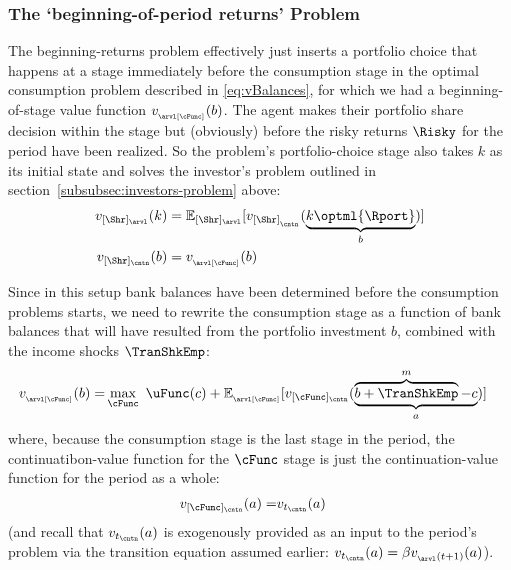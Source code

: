 \documentclass[titlepage, headings=optiontotocandhead]{Resources/texmf-local/tex/latex/econtex}
\begin{document}
\hypertarget{beginning-returns}{}
\subsubsection{The `beginning-of-period returns' Problem}\label{subsubsec:beginning-returns}
The beginning-returns problem effectively just inserts a portfolio choice that happens at a {stage} immediately before the consumption {stage} in the optimal consumption problem described in \eqref{eq:vBalances}, for which we had a beginning-of-{stage} value function $v_{_\arvl[\cFunc]}(b)$.  The agent makes their portfolio share decision within the {stage} but (obviously) before the risky returns $\Risky$ for the {period} have been realized.  So the problem's portfolio-choice {stage} also takes $k$ as its initial state and solves the investor's problem outlined in section~\ref{subsubsec:investors-problem} above:
\begin{equation}\begin{gathered}\begin{aligned}
  v_{[\Shr]_\arvl}(k) & = \Ex_{[\Shr]_\arvl}[v_{[\Shr]_{_\cntn}}(\underbrace{k\optml{\Rport}}_{b})]
\\v_{[\Shr]_\cntn}(b)  & = v_{_\arvl[\cFunc]}(b)
    \end{aligned}\end{gathered}\end{equation}

Since in this setup bank balances have been determined before the consumption problems starts, we need to rewrite the consumption {stage}  as a function of bank balances that will have resulted from the portfolio investment $b$, combined with the income shocks $\TranShkEmp$:
\begin{equation}\begin{gathered}\begin{aligned}
      v_{_\arvl[\cFunc]}(b) = & \max_{\cFunc}~ \uFunc(c) + \Ex_{_\arvl[\cFunc]}[v_{[\cFunc]_\cntn}(\underbrace{\overbrace{b+\TranShkEmp}^{m}-c}_{a})]
    \end{aligned}\end{gathered}\end{equation}
where, because the consumption {stage} is the last {stage} in the {period}, the continuatibon-value function for the $\cFunc$ {stage} is just the continuation-value function for the period as a whole:
\begin{equation}\begin{gathered}\begin{aligned}
      v_{[\cFunc]_\cntn}(a) = & v_{t_\cntn}(a)
    \end{aligned}\end{gathered}\end{equation}
(and recall that $v_{t_\cntn}(a)$ is exogenously provided as an input to the {period}'s problem via the transition equation assumed earlier: $v_{t_\cntn}(a)=\beta v_{_\arvl(t+1)}(a)$).
\end{document}
